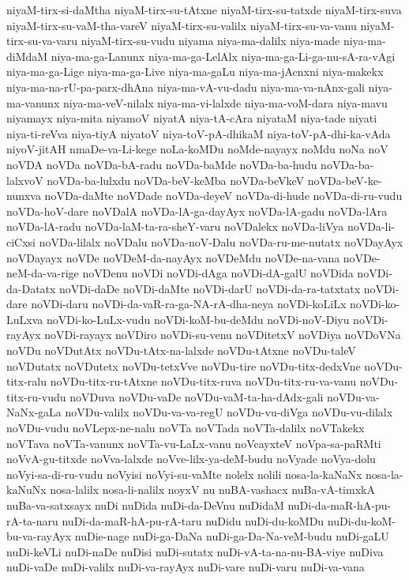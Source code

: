 {niyaM-tirx-si-daMtha
niyaM-tirx-su-tAtxne
niyaM-tirx-su-tatxde
niyaM-tirx-suva
niyaM-tirx-su-vaM-tha-vareV
niyaM-tirx-su-valilx
niyaM-tirx-su-va-vanu
niyaM-tirx-su-va-varu
niyaM-tirx-su-vudu
niyama
niya-ma-dalilx
niya-made
niya-ma-diMdaM
niya-ma-ga-Lanunx
niya-ma-ga-LelAlx
niya-ma-ga-Li-ga-nu-sA-ra-vAgi
niya-ma-ga-Lige
niya-ma-ga-Live
niya-ma-gaLu
niya-ma-jAcnxni
niya-makekx
niya-ma-na-rU-pa-parx-dhAna
niya-ma-vA-vu-dadu
niya-ma-va-nAnx-gali
niya-ma-vanunx
niya-ma-veV-nilalx
niya-ma-vi-lalxde
niya-ma-voM-dara
niya-mavu
niyamayx
niya-mita
niyamoV
niyatA
niya-tA-cAra
niyataM
niya-tade
niyati
niya-ti-reVva
niya-tiyA
niyatoV
niya-toV-pA-dhikaM
niya-toV-pA-dhi-ka-vAda
niyoV-jitAH
nmaDe-va-Li-kege
noLa-koMDu
noMde-nayayx
noMdu
noNa
noV
noVDA
noVDa
noVDa-bA-radu
noVDa-baMde
noVDa-ba-hudu
noVDa-ba-lalxvoV
noVDa-ba-lulxdu
noVDa-beV-keMba
noVDa-beVkeV
noVDa-beV-ke-nunxva
noVDa-daMte
noVDade
noVDa-deyeV
noVDa-di-hude
noVDa-di-ru-vudu
noVDa-hoV-dare
noVDalA
noVDa-lA-ga-dayAyx
noVDa-lA-gadu
noVDa-lAra
noVDa-lA-radu
noVDa-laM-ta-ra-sheY-varu
noVDalekx
noVDa-liVya
noVDa-li-ciCxsi
noVDa-lilalx
noVDalu
noVDa-noV-Dalu
noVDa-ru-me-nutatx
noVDayAyx
noVDayayx
noVDe
noVDeM-da-nayAyx
noVDeMdu
noVDe-na-vana
noVDe-neM-da-va-rige
noVDenu
noVDi
noVDi-dAga
noVDi-dA-galU
noVDida
noVDi-da-Datatx
noVDi-daDe
noVDi-daMte
noVDi-darU
noVDi-da-ra-tatxtatx
noVDi-dare
noVDi-daru
noVDi-da-vaR-ra-ga-NA-rA-dha-neya
noVDi-koLiLx
noVDi-ko-LuLxva
noVDi-ko-LuLx-vudu
noVDi-koM-bu-deMdu
noVDi-noV-Diyu
noVDi-rayAyx
noVDi-rayayx
noVDiro
noVDi-su-venu
noVDitetxV
noVDiya
noVDoVNa
noVDu
noVDutAtx
noVDu-tAtx-na-lalxde
noVDu-tAtxne
noVDu-taleV
noVDutatx
noVDutetx
noVDu-tetxVve
noVDu-tire
noVDu-titx-dedxVne
noVDu-titx-ralu
noVDu-titx-ru-tAtxne
noVDu-titx-ruva
noVDu-titx-ru-va-vanu
noVDu-titx-ru-vudu
noVDuva
noVDu-vaDe
noVDu-vaM-ta-ha-dAdx-gali
noVDu-va-NaNx-gaLa
noVDu-valilx
noVDu-va-va-regU
noVDu-vu-diVga
noVDu-vu-dilalx
noVDu-vudu
noVLepx-ne-nalu
noVTa
noVTada
noVTa-dalilx
noVTakekx
noVTava
noVTa-vanunx
noVTa-vu-LaLx-vanu
noVcayxteV
noVpa-sa-paRMti
noVvA-gu-titxde
noVva-lalxde
noVve-lilx-ya-deM-budu
noVyade
noVya-dolu
noVyi-sa-di-ru-vudu
noVyisi
noVyi-su-vaMte
nolelx
nolili
nosa-la-kaNaNx
nosa-la-kaNuNx
nosa-lalilx
nosa-li-nalilx
noyxV
nu
nuBA-vashacx
nuBa-vA-timxkA
nuBa-va-satxsayx
nuDi
nuDida
nuDi-da-DeVnu
nuDidaM
nuDi-da-maR-hA-pu-rA-ta-naru
nuDi-da-maR-hA-pu-rA-taru
nuDidu
nuDi-du-koMDu
nuDi-du-koM-bu-va-rayAyx
nuDie-nage
nuDi-ga-DaNa
nuDi-ga-Da-Na-veM-budu
nuDi-gaLU
nuDi-keVLi
nuDi-naDe
nuDisi
nuDi-sutatx
nuDi-vA-ta-na-nu-BA-viye
nuDiva
nuDi-vaDe
nuDi-valilx
nuDi-va-rayAyx
nuDi-vare
nuDi-varu
nuDi-va-vana
}
